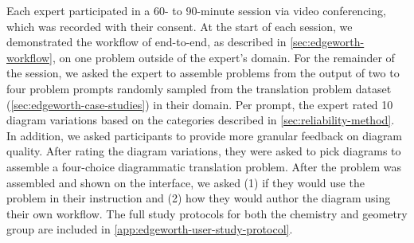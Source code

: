 Each expert participated in a 60- to 90-minute session via video conferencing, which was recorded with their consent. At the start of each session, we demonstrated the workflow of \Edgeworth end-to-end, as described in \cref{sec:edgeworth-workflow}, on one problem outside of the expert's domain. For the remainder of the session, we asked the expert to assemble problems from the \Edgeworth output of two to four problem prompts randomly sampled from the translation problem dataset (\cref{sec:edgeworth-case-studies}) in their domain. Per prompt, the expert rated 10 diagram variations based on the categories described in \cref{sec:reliability-method}. In addition, we asked participants to provide more granular feedback on diagram quality. After rating the diagram variations, they were asked to pick diagrams to assemble a four-choice diagrammatic translation problem. After the problem was assembled and shown on the interface, we asked (1) if they would use the problem in their instruction and (2) how they would author the diagram using their own workflow. The full study protocols for both the chemistry and geometry group are included in \cref{app:edgeworth-user-study-protocol}.





